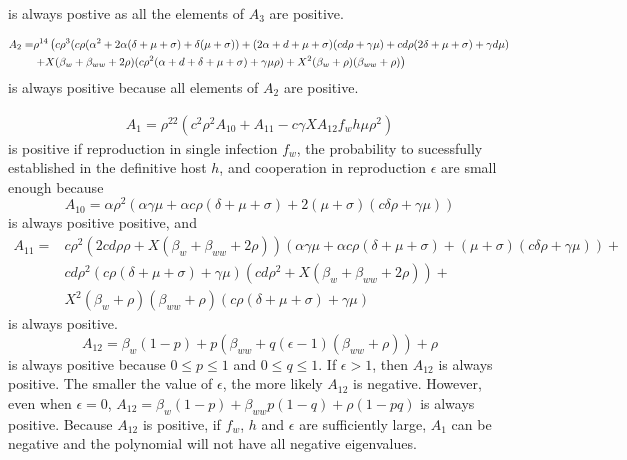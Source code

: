 \documentclass[11pt]{article}
\begin{document}
is always postive as all the elements of $A_3$ are positive.

\begin{align}
	A_2 = & \rho^{14} \left(c \rho ^3 (c \rho  (\alpha ^2+2 \alpha  (\delta +\mu +\sigma )+\delta  (\mu +\sigma ))+(2 \alpha +d+\mu +\sigma ) (c d \rho +\gamma  \mu )+c d \rho  (2 \delta +\mu +\sigma )+\gamma  d \mu ) \right. \notag \\
	&\left. +X (\beta_w + \beta_{ww}+2 \rho ) (c \rho ^2 (\alpha +d+\delta +\mu +\sigma )+\gamma  \mu  \rho )+X^2 (\beta_w+\rho ) (\beta_{ww}+\rho )\right)
\end{align}
is always positive because all elements of $A_2$ are positive.

\begin{align}
	A_1 =  \rho ^{22} \left(c^2 \rho ^2 A_{10} +A_{11}-c \gamma  X  A_{12} f_w h \mu  \rho ^2 \right)
\end{align}
is positive if reproduction in single infection $f_w$, the probability to sucessfully established in the definitive host $h$, and cooperation in reproduction $\epsilon$ are small enough because 
\begin{equation}
	A_{10} = \alpha  \rho ^2 (\alpha  \gamma  \mu +\alpha  c \rho  (\delta +\mu +\sigma )+2 (\mu +\sigma ) (c \delta  \rho +\gamma  \mu ))
\end{equation}
is always positive positive, and
\begin{align}
	A_{11} = & c \rho ^2 (2 c d \rho  \rho + X (\beta_w + \beta_{ww}+2 \rho )) (\alpha  \gamma  \mu +\alpha  c \rho  (\delta +\mu +\sigma ) +  (\mu +\sigma ) (c \delta  \rho +\gamma  \mu )) + \\
	& c d \rho ^2 (c \rho  (\delta +\mu +\sigma )+\gamma  \mu ) (c d \rho ^2+X (\beta_w+\beta_{ww}+2 \rho )) + \\
	& X^2 (\beta_w+\rho ) (\beta_{ww}+\rho ) (c \rho  (\delta +\mu +\sigma )+\gamma  \mu )
\end{align}
is always positive.
\begin{equation}
	A_{12} =\beta_w (1-p)+p (\beta_{ww}+q (\epsilon -1) (\beta_{ww}+\rho ))+\rho
\end{equation}
is always positive because $0 \leq p \leq 1$ and $0 \leq q \leq 1$. If $\epsilon > 1$, then $A_{12}$ is always positive. The smaller the value of $\epsilon$, the more likely $A_{12}$ is negative. However, even when $\epsilon = 0$, $A_{12} = \beta_w (1-p) + \beta_{ww} p (1-q)+\rho  (1-p q)$ is always positive.
Because $A_{12}$ is positive, if $f_w$, $h$ and $\epsilon$ are sufficiently large, $A_1$ can be negative and the polynomial will not have all negative eigenvalues.
\end{document}
